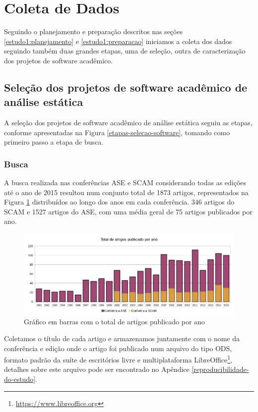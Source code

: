 
\section{Coleta de Dados} \label{estudo1:coleta}

Seguindo o planejamento e preparação descritos nas seções
\ref{estudo1:planejamento} e \ref{estudo1:preparacao} iniciamos a coleta dos
dados seguindo também duas grandes etapas, uma de seleção, outra de
caracterização dos projetos de software acadêmico.

\subsection{Seleção dos projetos de software acadêmico de análise estática} %

A seleção dos projetos de software acadêmico de análise estática seguiu
as etapas, conforme apresentadas na Figura \ref{etapas-selecao-software}, tomando
como primeiro passo a etapa de busca.

\subsubsection{Busca}

A busca realizada nas conferências ASE e SCAM considerando todas as edições até
o ano de 2015 resultou num conjunto total de 1873 artigos, representados na
Figura \ref{artigos-por-ano} distribuídos ao longo dos anos em cada conferência.
346 artigos do SCAM e 1527 artigos do ASE,
com uma média geral de 75 artigos publicados por ano. 

\begin{figure}[h]
  \center
  \includegraphics[scale=0.65]{imagens/artigos-por-ano.png}
  \caption{Gráfico em barras com o total de artigos publicado por ano}
  \label{artigos-por-ano}
\end{figure}

Coletamos o título de cada artigo e armazenamos juntamente com o nome da
conferência e edição onde o artigo foi publicado num arquivo do tipo ODS,
formato padrão da suíte de escritórios livre e multiplataforma
LibreOffice\footnote{\url{https://www.libreoffice.org}}, detalhes sobre este
arquivo pode ser encontrado no Apêndice \ref{reproducibilidade-do-estudo}.


